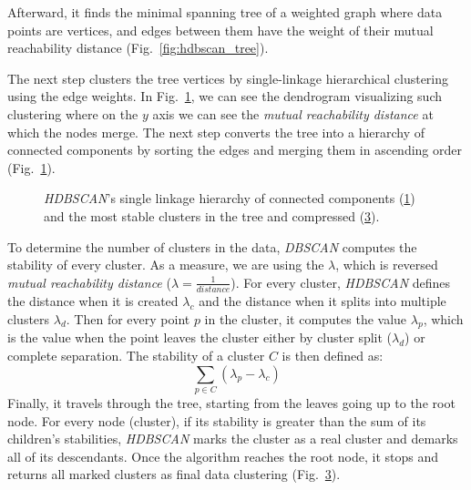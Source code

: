 Afterward, it finds the minimal spanning tree of a weighted graph where data points are vertices, and edges between them have the weight of their mutual reachability distance (Fig.~\ref{fig:hdbscan_tree}).

The next step clusters the tree vertices by single-linkage hierarchical clustering using the edge weights. In Fig.~\ref{fig:hdbscan_hier}, we can see the dendrogram visualizing such clustering where on the $y$ axis we can see the \textit{mutual reachability distance} at which the nodes merge.
The next step converts the tree into a hierarchy of connected components by sorting the edges and merging them in ascending order (Fig.~\ref{fig:hdbscan_hier}). 
\begin{figure}[ht]
     \centering
     \begin{subfigure}[b]{0.48\textwidth}
        \centering
        
        \caption{}
        \label{fig:hdbscan_hier}
     \end{subfigure}
     \hfill
     \begin{subfigure}[b]{0.48\textwidth}
        \centering
        
        \caption{}
        \label{fig:hdbscan_cons}
     \end{subfigure}
    \caption{\textit{HDBSCAN}'s single linkage hierarchy of connected components (\ref{fig:hdbscan_hier}) and the most stable clusters in the tree and compressed (\ref{fig:hdbscan_cons}).
    }
\end{figure}
To determine the number of clusters in the data, \textit{DBSCAN} computes the stability of every cluster. As a measure, we are using the $\lambda$, which is reversed \textit{mutual reachability distance} ($\lambda = \frac{1}{distance}$). For every cluster, \textit{HDBSCAN} defines the distance when it is created $\lambda_c$ and the distance when it splits into multiple clusters $\lambda_d$. Then for every point $p$ in the cluster, it computes the value $\lambda_p$, which is the value when the point leaves the cluster either by cluster split ($\lambda_d$) or complete separation. The stability of a cluster $C$ is then defined as:
\begin{equation}
    \sum_{p \in C}(\lambda_p - \lambda_c)
\end{equation}
Finally, it travels through the tree, starting from the leaves going up to the root node. For every node (cluster), if its stability is greater than the sum of its children's stabilities, \textit{HDBSCAN} marks the cluster as a real cluster and demarks all of its descendants. Once the algorithm reaches the root node, it stops and returns all marked clusters as final data clustering (Fig.~\ref{fig:hdbscan_cons}).

